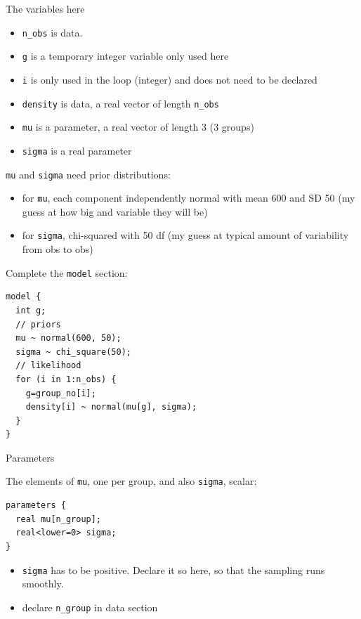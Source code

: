 \documentclass[
  ignorenonframetext,
]{beamer}
\providecommand{\tightlist}{%
  \setlength{\itemsep}{0pt}\setlength{\parskip}{0pt}}
\begin{document}
\begin{frame}[fragile]{The variables here}
\protect\hypertarget{the-variables-here}{}

\begin{itemize}
\tightlist
\item
  \texttt{n\_obs} is data.
\item
  \texttt{g} is a temporary integer variable only used here
\item
  \texttt{i} is only used in the loop (integer) and does not need to be
  declared
\item
  \texttt{density} is data, a real vector of length \texttt{n\_obs}
\item
  \texttt{mu} is a parameter, a real vector of length 3 (3 groups)
\item
  \texttt{sigma} is a real parameter
\end{itemize}

\texttt{mu} and \texttt{sigma} need prior distributions:

\begin{itemize}
\tightlist
\item
  for \texttt{mu}, each component independently normal with mean 600 and
  SD 50 (my guess at how big and variable they will be)
\item
  for \texttt{sigma}, chi-squared with 50 df (my guess at typical amount
  of variability from obs to obs)
\end{itemize}

\end{frame}

\begin{frame}[fragile]{Complete the \texttt{model} section:}
\protect\hypertarget{complete-the-model-section}{}

\begin{verbatim}
model {
  int g;
  // priors
  mu ~ normal(600, 50);
  sigma ~ chi_square(50);
  // likelihood
  for (i in 1:n_obs) {
    g=group_no[i];
    density[i] ~ normal(mu[g], sigma);
  }
}
\end{verbatim}

\end{frame}

\begin{frame}[fragile]{Parameters}
\protect\hypertarget{parameters}{}

The elements of \texttt{mu}, one per group, and also \texttt{sigma},
scalar:

\begin{verbatim}
parameters {
  real mu[n_group];
  real<lower=0> sigma;
}
\end{verbatim}

\begin{itemize}
\tightlist
\item
  \texttt{sigma} has to be positive. Declare it so here, so that the
  sampling runs smoothly.
\item
  declare \texttt{n\_group} in data section
\end{itemize}

\end{frame}
\end{document}
